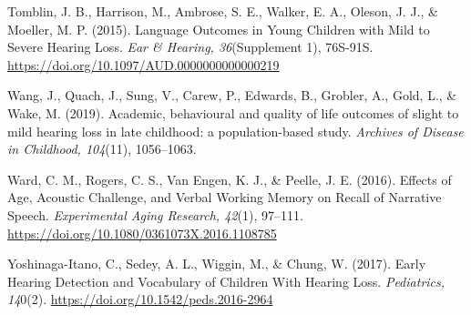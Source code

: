 \documentclass[]{article}
\begin{document}
Tomblin, J. B., Harrison, M., Ambrose, S. E., Walker, E. A., Oleson, J.
J., \& Moeller, M. P. (2015). Language Outcomes in Young Children with
Mild to Severe Hearing Loss. \emph{Ear \& Hearing, 36}(Supplement 1),
76S-91S. \url{https://doi.org/10.1097/AUD.0000000000000219}

Wang, J., Quach, J., Sung, V., Carew, P., Edwards, B., Grobler, A.,
Gold, L., \& Wake, M. (2019). Academic, behavioural and quality of life
outcomes of slight to mild hearing loss in late childhood: a
population-based study. \emph{Archives of Disease in Childhood,
104}(11), 1056--1063.

Ward, C. M., Rogers, C. S., Van Engen, K. J., \& Peelle, J. E. (2016).
Effects of Age, Acoustic Challenge, and Verbal Working Memory on Recall
of Narrative Speech. \emph{Experimental Aging Research, 42}(1), 97--111.
\url{https://doi.org/10.1080/0361073X.2016.1108785}

Yoshinaga-Itano, C., Sedey, A. L., Wiggin, M., \& Chung, W. (2017).
Early Hearing Detection and Vocabulary of Children With Hearing Loss.
\emph{Pediatrics, 14}0(2). \url{https://doi.org/10.1542/peds.2016-2964}
\end{document}
